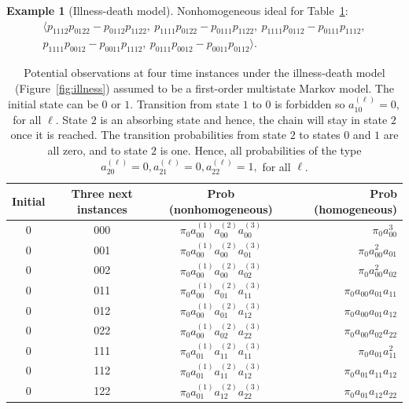 \documentclass[11pt, a4paper]{article}
\numberwithin{equation}{section}
\theoremstyle{plain}
\theoremstyle{definition}
\newtheorem{example}{Example}
\begin{document}
\begin{example}[Illness-death model]
Nonhomogeneous ideal for Table~\ref{tab:obsevations4}:
\begin{gather*}
    \langle
p_{1 1 1 2}p_{0 1 2 2}-p_{0 1 1 2}p_{1 1 2 2},\ p_{1 1 1 1}p_{0 1 2 2}-p_{0 1 1 1}p_{1 1 2 2},\ p_{1 1 1 1}p_{0 1 1 2}-p_{0 1 1 1}p_{1 1 1 2},\\
    p_{1 1 1 1}p_{0 01 2}-p_{0 0 1 1}p_{1 1 1 2},\ p_{0 1 1 1}p_{0 0 1 2}-p_{0 0 1 1}p_{0 1 1 2} 
\rangle.
\end{gather*}

{\renewcommand{\arraystretch}{1.2}%
\begin{table}[!ht]
    \centering 
    \caption{Potential observations at four time instances under the illness-death model (Figure~\ref{fig:illness}) assumed to be a first-order multistate Markov model. The initial state can be $0$ or $1$. Transition from state $1$ to $0$ is forbidden so $a_{10}^{(\ell)} = 0,$ for all $\ell$. State $2$ is an absorbing state and hence, the chain will stay in state $2$ once it is  reached. The transition probabilities from state $2$ to states $0$ and $1$ are all zero, and to state $2$ is one. Hence, all probabilities of the type $a_{20}^{(\ell)} = 0, a_{21}^{(\ell)} = 0, a_{22}^{(\ell)} = 1,$ for all $\ell$.}\label{tab:obsevations4}
    \begin{tabular}{c|c|c|r}
    \hline
        Initial & Three next instances & Prob (nonhomogeneous) & Prob (homogeneous)\\
        \hline
        0 & 000 & $\pi_0a_{00}^{(1)} a_{00}^{(2)} a_{00}^{(3)}$ & $\pi_0a_{00}^3$ \\
        0 & 001  & $\pi_0a_{00}^{(1)} a_{00}^{(2)} a_{01}^{(3)}$ & $\pi_0a_{00}^2 a_{01}$ \\
        0 & 002  & $\pi_0a_{00}^{(1)} a_{00}^{(2)} a_{02}^{(3)}$ & $\pi_0a_{00}^2 a_{02}$ \\
        0 & 011  & $\pi_0a_{00}^{(1)} a_{01}^{(2)} a_{11}^{(3)}$ & $\pi_0a_{00} a_{01} a_{11}$ \\
        0 & 012  & $\pi_0a_{00}^{(1)} a_{01}^{(2)} a_{12}^{(3)}$ & $\pi_0a_{00} a_{01} a_{12}$ \\
        0 & 022  & $\pi_0a_{00}^{(1)} a_{02}^{(2)} a_{22}^{(3)}$ & $\pi_0a_{00} a_{02} a_{22}$ \\
        0 & 111  & $\pi_0a_{01}^{(1)} a_{11}^{(2)} a_{11}^{(3)}$ & $\pi_0a_{01} a_{11}^2$ \\
        0 & 112  & $\pi_0a_{01}^{(1)} a_{11}^{(2)} a_{12}^{(3)}$ & $\pi_0a_{01} a_{11} a_{12}$ \\
        0 & 122  & $\pi_0a_{01}^{(1)} a_{12}^{(2)} a_{22}^{(3)}$ & $\pi_0a_{01} a_{12} a_{22}$\\

\end{tabular}
\end{table}}
\end{example}
\end{document}
